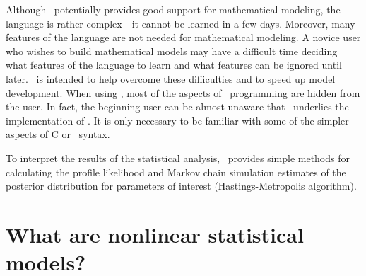 \documentclass{admbmanual}
\begin{document}
Although \cplus\ potentially provides good support for mathematical modeling,
the language is rather complex---it cannot be learned in a few days. Moreover,
many features of the language are not needed for mathematical modeling. A novice
user who wishes to build mathematical models may have a difficult time deciding
what features of the language to learn and what features can be ignored until
later. \ADM\ is intended to help overcome these difficulties and to speed up
model development. When using \ADM, most of the aspects of \cplus\ programming
are hidden from the user. In fact, the beginning user can be almost unaware that
\cplus\ underlies the implementation of \ADM. It is only necessary to be
familiar with some of the simpler aspects of C or \cplus~syntax.

To interpret the results of the statistical analysis, \ADM\ provides simple
methods for calculating the profile likelihood and Markov chain simulation
estimates of the posterior distribution for parameters of interest
(Hastings-Metropolis algorithm).

\section{What are nonlinear statistical models?}
\end{document}
